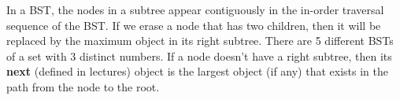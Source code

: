 \begin{parts}
    \begin{choices}
        \CorrectChoice In a BST, the nodes in a subtree appear contiguously in the in-order traversal sequence of the BST.
        \choice If we erase a node that has two children, then it will be replaced by the maximum object in its right subtree.
        \CorrectChoice There are 5 different  BSTs of a set with 3 distinct numbers.
        \choice If a node doesn't have a right subtree, then its \textbf{next} (defined in lectures) object is the largest object (if any) that exists in the path from the node to the root.
    \end{choices}







\end{parts}

